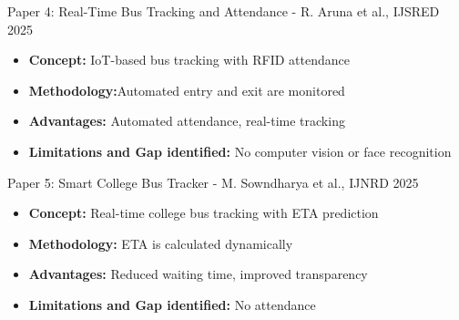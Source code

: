 \documentclass{beamer}
\begin{document}
\begin{frame}{Paper 4: Real-Time Bus Tracking and Attendance - R. Aruna et al., IJSRED 2025}

\begin{itemize}
\item \textbf{Concept:} IoT-based bus tracking with RFID attendance
\item \textbf{Methodology:}Automated entry and exit are monitored
\item \textbf{Advantages:} Automated attendance, real-time tracking
\item \textbf{Limitations and Gap identified:} No computer vision or face recognition

\end{itemize}
\end{frame}

\begin{frame}{Paper 5: Smart College Bus Tracker - M. Sowndharya et al., IJNRD 2025}

\begin{itemize}
\item \textbf{Concept:} Real-time college bus tracking with ETA prediction
\item \textbf{Methodology:} ETA is calculated dynamically
\item \textbf{Advantages:} Reduced waiting time, improved transparency
\item \textbf{Limitations and Gap identified:} No attendance

\end{itemize}
\end{frame}
\end{document}
